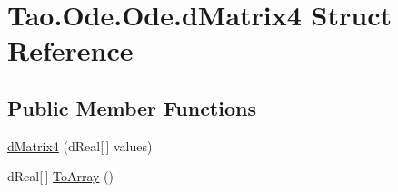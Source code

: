 \hypertarget{struct_tao_1_1_ode_1_1_ode_1_1d_matrix4}{
\section{Tao.Ode.Ode.dMatrix4 Struct Reference}
\label{struct_tao_1_1_ode_1_1_ode_1_1d_matrix4}
}
\subsection*{Public Member Functions}
\begin{DoxyCompactItemize}
\item 
\hyperlink{struct_tao_1_1_ode_1_1_ode_1_1d_matrix4_ab9b918f375a4f5f59dac3666a34f4ab4}{dMatrix4} (dReal\mbox{[}$\,$\mbox{]} values)
\item 
dReal\mbox{[}$\,$\mbox{]} \hyperlink{struct_tao_1_1_ode_1_1_ode_1_1d_matrix4_a93edc4782097f8acf443261bcf4c5604}{ToArray} ()
\end{DoxyCompactItemize}
